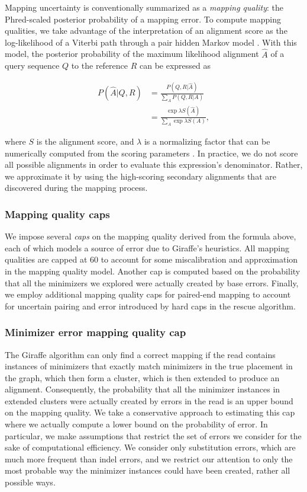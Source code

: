 \documentclass[11pt]{ucscthesis}
\newcommand{\vocab}[1]{\emph{#1}}
\begin{document}
Mapping uncertainty is conventionally summarized as a \vocab{mapping quality}: the Phred-scaled \cite{ewing1998base} posterior probability of a mapping error. To compute mapping qualities, we take advantage of the interpretation of an alignment score as the log-likelihood of a Viterbi path through a pair hidden Markov model \cite{durbin1998biological}. With this model, the posterior probability of the maximum likelihood alignment $\hat A$ of a query sequence $Q$ to the reference $R$ can be expressed as

\begin{align}
    P(\hat A| Q, R) &= \frac{P(Q, R | \hat A)}{\sum_A P(Q,R|A)} \nonumber \\
    &= \frac{\exp \lambda S(\hat A)}{\sum_A \exp \lambda S(A)}, \nonumber
\end{align}

\noindent where $S$ is the alignment score, and $\lambda$ is a normalizing factor that can be numerically computed from the scoring parameters \cite{karlin1990methods}. In practice, we do not score all possible alignments in order to evaluate this expression's denominator. Rather, we approximate it by using the high-scoring secondary alignments that are discovered during the mapping process.



\subsubsection{Mapping quality caps}

We impose several \vocab{caps} on the mapping quality derived from the formula above, each of which models a source of error due to Giraffe's heuristics.
All mapping qualities are capped at 60 to account for some miscalibration and approximation in the mapping quality model.
Another cap is computed based on the probability that all the minimizers we explored were actually created by base errors.
Finally, we employ additional mapping quality caps for paired-end mapping to account for uncertain pairing and error introduced by hard caps in the rescue algorithm.

\subsubsection{Minimizer error mapping quality cap}

The Giraffe algorithm can only find a correct mapping if the read contains instances of minimizers that exactly match minimizers in the true placement in the graph, which then form a cluster, which is then extended to produce an alignment. 
Consequently, the probability that all the minimizer instances in extended clusters were actually created by errors in the read is an upper bound on the mapping quality.
We take a conservative approach to estimating this cap where we actually compute a lower bound on the probability of error. 
In particular, we make assumptions that restrict the set of errors we consider for the sake of computational efficiency.
We consider only substitution errors, which are much more frequent than indel errors, and we restrict our attention to only the most probable way the minimizer instances could have been created, rather all possible ways. 
\end{document}

